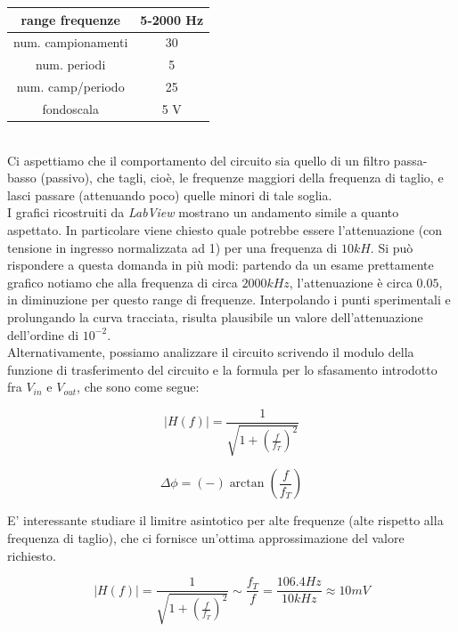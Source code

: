 \documentclass[journal, a4paper]{IEEEtran}
\begin{document}
\begin{tabular}{|c|c|}
\hline range frequenze & 5-2000 \si{Hz} \\ 
\hline num. campionamenti & 30 \\ 
\hline num. periodi & 5 \\ 
\hline num. camp/periodo & 25 \\ 
\hline fondoscala & 5 \si{V} \\ 
\hline 
\end{tabular} \\


Ci aspettiamo che il comportamento del circuito sia quello di un filtro passa-basso (passivo), che tagli, cioè, le frequenze maggiori della frequenza di taglio, e lasci passare (attenuando poco) quelle minori di tale soglia. \\
I grafici ricostruiti da \textit{LabView} mostrano un andamento simile a quanto aspettato. In particolare viene chiesto quale potrebbe essere l'attenuazione (con tensione in ingresso normalizzata ad 1) per una frequenza di $10 \si{kH}$. Si può rispondere a questa domanda in più modi: partendo da un esame prettamente grafico notiamo che alla frequenza di circa $2000\si{kHz}$, l'attenuazione è circa $0.05$, in diminuzione per questo range di frequenze. Interpolando i punti sperimentali e prolungando la curva tracciata, risulta plausibile un valore dell'attenuazione dell'ordine di $10^{-2}$. \\
Alternativamente, possiamo analizzare il circuito scrivendo il modulo della funzione di trasferimento del circuito e la formula per lo sfasamento introdotto fra $V_{in}$ e $V_{out}$, che sono come segue:

\begin{equation}\label{F_trasf}
\rvert H(f) \lvert = \frac{1}{\sqrt{1+(\frac{f}{f_T})^2}}
\end{equation}

\begin{equation}
\Delta \phi = (-)\arctan(\frac{f}{f_T})
\end{equation}


E' interessante studiare il limitre asintotico per alte frequenze (alte rispetto alla frequenza di taglio), che ci fornisce un'ottima approssimazione del valore richiesto.

\begin{equation}
\rvert H(f) \lvert = \frac{1}{\sqrt{1+(\frac{f}{f_T})^2}}
\sim \frac{f_T}{f} 
= \frac{106.4 \si{Hz}}{10\si{kHz}} 
\approx 10 mV 
\end{equation}
\end{document}
